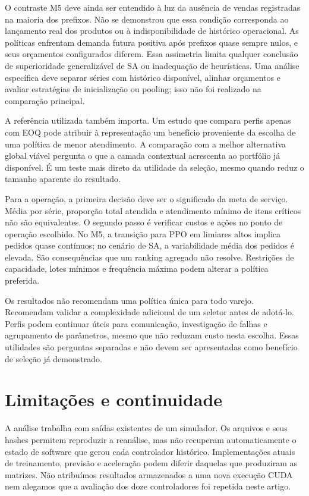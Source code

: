 \documentclass[preprint,12pt]{elsarticle}
\begin{document}
O contraste M5 deve ainda ser entendido à luz da ausência de vendas registradas na maioria dos prefixos. Não se demonstrou que essa condição corresponda ao lançamento real dos produtos ou à indisponibilidade de histórico operacional. As políticas enfrentam demanda futura positiva após prefixos quase sempre nulos, e seus orçamentos configurados diferem. Essa assimetria limita qualquer conclusão de superioridade generalizável de SA ou inadequação de heurísticas. Uma análise específica deve separar séries com histórico disponível, alinhar orçamentos e avaliar estratégias de inicialização ou pooling; isso não foi realizado na comparação principal.

A referência utilizada também importa. Um estudo que compara perfis apenas com EOQ pode atribuir à representação um benefício proveniente da escolha de uma política de menor atendimento. A comparação com a melhor alternativa global viável pergunta o que a camada contextual acrescenta ao portfólio já disponível. É um teste mais direto da utilidade da seleção, mesmo quando reduz o tamanho aparente do resultado.

Para a operação, a primeira decisão deve ser o significado da meta de serviço. Média por série, proporção total atendida e atendimento mínimo de itens críticos não são equivalentes. O segundo passo é verificar custos e ações no ponto de operação escolhido. No M5, a transição para PPO em limiares altos implica pedidos quase contínuos; no cenário de SA, a variabilidade média dos pedidos é elevada. São consequências que um ranking agregado não resolve. Restrições de capacidade, lotes mínimos e frequência máxima podem alterar a política preferida.

Os resultados não recomendam uma política única para todo varejo. Recomendam validar a complexidade adicional de um seletor antes de adotá-lo. Perfis podem continuar úteis para comunicação, investigação de falhas e agrupamento de parâmetros, mesmo que não reduzam custo nesta escolha. Essas utilidades são perguntas separadas e não devem ser apresentadas como benefício de seleção já demonstrado.

\section{Limitações e continuidade}
A análise trabalha com saídas existentes de um simulador. Os arquivos e seus hashes permitem reproduzir a reanálise, mas não recuperam automaticamente o estado de software que gerou cada controlador histórico. Implementações atuais de treinamento, previsão e aceleração podem diferir daquelas que produziram as matrizes. Não atribuímos resultados armazenados a uma nova execução CUDA nem alegamos que a avaliação dos doze controladores foi repetida neste artigo.
\end{document}
